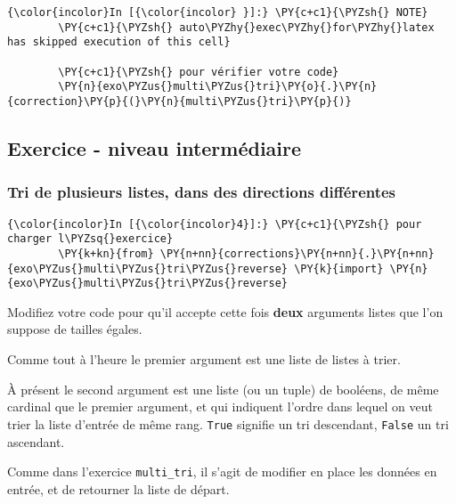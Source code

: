     \begin{Verbatim}[commandchars=\\\{\}]
{\color{incolor}In [{\color{incolor} }]:} \PY{c+c1}{\PYZsh{} NOTE}
        \PY{c+c1}{\PYZsh{} auto\PYZhy{}exec\PYZhy{}for\PYZhy{}latex has skipped execution of this cell}
        
        \PY{c+c1}{\PYZsh{} pour vérifier votre code}
        \PY{n}{exo\PYZus{}multi\PYZus{}tri}\PY{o}{.}\PY{n}{correction}\PY{p}{(}\PY{n}{multi\PYZus{}tri}\PY{p}{)}
\end{Verbatim}


    \hypertarget{exercice---niveau-intermuxe9diaire}{%
\subsection{Exercice - niveau
intermédiaire}\label{exercice---niveau-intermuxe9diaire}}

    \hypertarget{tri-de-plusieurs-listes-dans-des-directions-diffuxe9rentes}{%
\subsubsection{Tri de plusieurs listes, dans des directions
différentes}\label{tri-de-plusieurs-listes-dans-des-directions-diffuxe9rentes}}

    \begin{Verbatim}[commandchars=\\\{\}]
{\color{incolor}In [{\color{incolor}4}]:} \PY{c+c1}{\PYZsh{} pour charger l\PYZsq{}exercice}
        \PY{k+kn}{from} \PY{n+nn}{corrections}\PY{n+nn}{.}\PY{n+nn}{exo\PYZus{}multi\PYZus{}tri\PYZus{}reverse} \PY{k}{import} \PY{n}{exo\PYZus{}multi\PYZus{}tri\PYZus{}reverse}
\end{Verbatim}


    Modifiez votre code pour qu'il accepte cette fois \textbf{deux}
arguments listes que l'on suppose de tailles égales.

Comme tout à l'heure le premier argument est une liste de listes à
trier.

À présent le second argument est une liste (ou un tuple) de booléens, de
même cardinal que le premier argument, et qui indiquent l'ordre dans
lequel on veut trier la liste d'entrée de même rang. \texttt{True}
signifie un tri descendant, \texttt{False} un tri ascendant.

Comme dans l'exercice \texttt{multi\_tri}, il s'agit de modifier en
place les données en entrée, et de retourner la liste de départ.

